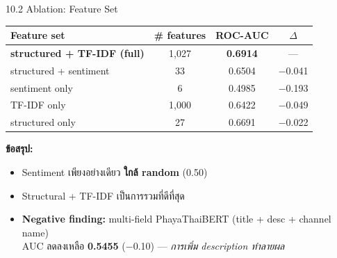 \documentclass[aspectratio=169,11pt,xcolor=dvipsnames]{beamer}
\newcommand{\hl}[1]{\textcolor{kmitlOrange}{\textbf{#1}}}
\begin{document}
\begin{frame}{10.2 Ablation: Feature Set}
  \begin{center}
    \begin{tabular}{lccc}
      \toprule
      \textbf{Feature set} & \textbf{\# features} & \textbf{ROC-AUC} & \textbf{$\Delta$}\\
      \midrule
      \hl{structured + TF-IDF (full)} & 1{,}027 & \textbf{0.6914} & ---\\
      structured + sentiment          & 33      & 0.6504 & $-$0.041\\
      sentiment only                  & 6       & 0.4985 & $-$0.193\\
      TF-IDF only                     & 1{,}000 & 0.6422 & $-$0.049\\
      structured only                 & 27      & 0.6691 & $-$0.022\\
      \bottomrule
    \end{tabular}
  \end{center}
  \vspace{0.4em}
  \textbf{ข้อสรุป:}
  \begin{itemize}
    \item Sentiment เพียงอย่างเดียว \hl{ใกล้ random} (0.50)
    \item Structural + TF-IDF เป็นการรวมที่ดีที่สุด
    \item \hl{Negative finding:} multi-field PhayaThaiBERT (title + desc + channel name) \\
       AUC ลดลงเหลือ \hl{0.5455} ($-$0.10) — \emph{การเพิ่ม description ทำลายผล}
  \end{itemize}
\end{frame}
\end{document}

